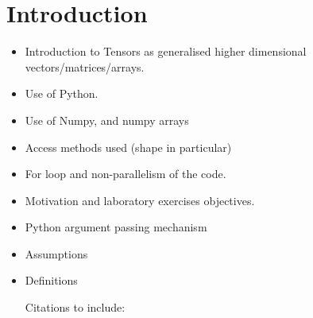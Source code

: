 \documentclass[10 pt, conference]{cssconf}
\begin{document}
\section*{Introduction}
\begin{itemize}
    \item Introduction to Tensors as generalised higher dimensional vectors/matrices/arrays.
    \item Use of Python. 
    \item Use of Numpy, and numpy arrays
    \item Access methods used (shape in particular)
    \item For loop and non-parallelism of the code.
    \item Motivation and laboratory exercises objectives.
    \item Python argument passing mechanism
    \item Assumptions
    \item Definitions
    
    Citations to include: \cite{hackbusch2012tensor} \cite{Hunt-notes} \cite{sochi2016introduction} \cite{sringeri2015tensor}
\end{itemize}
\setcounter{section}{0}
\end{document}
